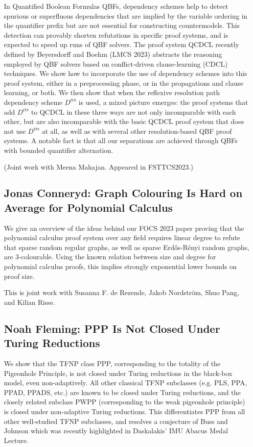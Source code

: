 \documentclass[11pt]{article}
\begin{document}
In Quantified Boolean Formulas QBFs, dependency schemes help
to detect spurious or superfluous dependencies that are implied by the
variable ordering in the quantifier prefix but are not essential for
constructing countermodels. This detection can provably shorten
refutations in specific proof systems, and is expected to speed up
runs of QBF solvers. The proof system QCDCL recently defined by
Beyersdorff and Boehm (LMCS 2023) abstracts the reasoning employed by
QBF solvers based on conflict-driven clause-learning (CDCL)
techniques. We show how to incorporate the use of dependency schemes
into this proof system, either in a preprocessing phase, or in the
propagations and clause learning, or both. We then show that when the
reflexive resolution path dependency scheme $D^{\mathrm{rrs}}$ is used, a mixed
picture emerges: the proof systems that add $D^{\mathrm{rrs}}$ to QCDCL in these
three ways are not only incomparable with each other, but are also
incomparable with the basic QCDCL proof system that does not use $D^{\mathrm{rrs}}$
at all, as well as with several other resolution-based QBF proof
systems. A notable fact is that all our separations are achieved
through QBFs with bounded quantifier alternation.

(Joint work with Meena Mahajan. Appeared in FSTTCS2023.)


\subsection*{Jonas Conneryd: Graph Colouring Is Hard on Average for Polynomial Calculus}\label{Conneryd}

We give an overview of the ideas behind our FOCS 2023 paper proving that the polynomial calculus proof system over any field requires linear degree to refute that sparse random regular graphs, as well as sparse Erd\H{o}s-R\'{e}nyi random graphs, are $3$-colourable. Using the known relation between size and degree for polynomial calculus proofs, this implies strongly exponential lower bounds on proof size.

This is joint work with Susanna F. de Rezende, Jakob Nordström, Shuo Pang, and Kilian Risse. 


\subsection*{Noah Fleming: PPP Is Not Closed Under Turing Reductions}\label{Fleming}

We show that the TFNP class PPP, corresponding to the totality of the Pigeonhole Principle, is not closed under Turing reductions in the black-box model, even non-adaptively. All other classical TFNP subclasses (e.g. PLS, PPA, PPAD, PPADS, etc.) are known to be closed under Turing reductions, and the closely related subclass PWPP (corresponding to the weak pigeonhole principle) is closed under non-adaptive Turing reductions. This differentiates PPP from all other well-studied TFNP subclasses, and resolves a conjecture of Buss and Johnson which was recently highlighted in Daskalakis’ IMU Abacus Medal Lecture. 
\end{document}
